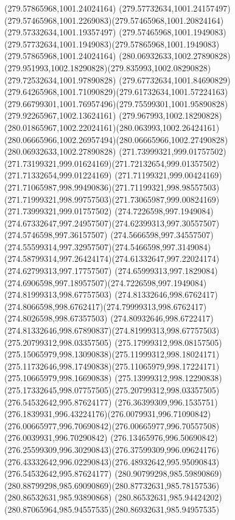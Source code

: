 {{	\moveto(279.57865968,1001.24024164)
	\lineto(279.57732634,1001.24157497)
	\curveto(279.57465968,1001.2269083)(279.57465968,1001.20824164)(279.57332634,1001.19357497)
	\curveto(279.57465968,1001.1949083)(279.57732634,1001.1949083)(279.57865968,1001.1949083)
	\lineto(279.57865968,1001.24024164)
	\moveto(280.06932633,1002.27890828)
	\curveto(279.951993,1002.18290828)(279.835993,1002.08290828)(279.72532634,1001.97890828)
	\curveto(279.67732634,1001.84690829)(279.64265968,1001.71090829)(279.61732634,1001.57224163)
	\curveto(279.66799301,1001.76957496)(279.75599301,1001.95890828)(279.92265967,1002.13624161)
	\curveto(279.967993,1002.18290828)(280.01865967,1002.22024161)(280.063993,1002.26424161)
	\curveto(280.06665966,1002.26957494)(280.06665966,1002.27490828)(280.06932633,1002.27890828)
	\moveto(271.73999321,999.01757502)
	\curveto(271.73199321,999.01624169)(271.72132654,999.01357502)(271.71332654,999.01224169)
	\curveto(271.71199321,999.00424169)(271.71065987,998.99490836)(271.71199321,998.98557503)
	\curveto(271.71999321,998.99757503)(271.73065987,999.00824169)(271.73999321,999.01757502)
	\moveto(274.7226598,997.1949084)
	\curveto(274.67332647,997.24957507)(274.62399313,997.30557507)(274.5746598,997.36157507)
	\curveto(274.5666598,997.34557507)(274.55599314,997.32957507)(274.5466598,997.3149084)
	\curveto(274.58799314,997.26424174)(274.61332647,997.22024174)(274.62799313,997.17757507)
	\curveto(274.65999313,997.1829084)(274.6906598,997.18957507)(274.7226598,997.1949084)
	\moveto(274.81999313,998.67757503)
	\curveto(274.81332646,998.6762417)(274.8066598,998.6762417)(274.79999313,998.6762417)
	\lineto(274.8026598,998.67357503)
	\curveto(274.80932646,998.6722417)(274.81332646,998.67890837)(274.81999313,998.67757503)
	\moveto(275.20799312,998.03357505)
	\curveto(275.17999312,998.08157505)(275.15065979,998.13090838)(275.11999312,998.18024171)
	\curveto(275.11732646,998.17490838)(275.11065979,998.17224171)(275.10665979,998.16690838)
	\curveto(275.13999312,998.12290838)(275.17332645,998.07757505)(275.20799312,998.03357505)
	\moveto(276.54532642,995.87624177)
	\curveto(276.36399309,996.1535751)(276.1839931,996.43224176)(276.0079931,996.71090842)
	\curveto(276.00665977,996.70690842)(276.00665977,996.70557508)(276.0039931,996.70290842)
	\curveto(276.13465976,996.50690842)(276.25599309,996.30290843)(276.37599309,996.09624176)
	\curveto(276.43332642,996.02290843)(276.48932642,995.95090843)(276.54532642,995.87624177)
	\moveto(280.90799298,985.59890869)
	\curveto(280.88799298,985.69090869)(280.87732631,985.78157536)(280.86532631,985.93890868)
	\curveto(280.86532631,985.94424202)(280.87065964,985.94557535)(280.86932631,985.94957535)
}}
